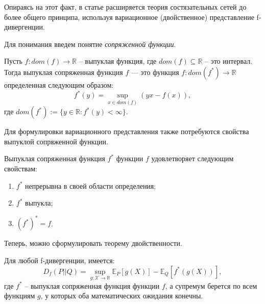 Опираясь на этот факт, в статье \cite{fgan} расширяется теория состязательных сетей до более общего принципа, используя вариационное (двойственное) представление f-дивергенции.

Для понимания введем понятие \textit{сопряженной функции}.
\begin{definition}
    Пусть $f:dom(f) \rightarrow \mathbb{R}$ -- выпуклая функция, где $dom(f) \subseteq \mathbb{R}$ -- это интервал. Тогда выпуклая сопряженная функция $f$ — это функция $f: dom(f^*) \rightarrow \mathbb{R}$ определенная следующим образом:
    \begin{equation*}
        f^*(y) = \sup_{x\in dom(f)}(yx - f(x)),
    \end{equation*}
    где $dom(f^*):=\{y \in \mathbb{R}: f^*(y) < \infty\}$.
\end{definition}

Для формулировки вариационного представления также потребуются свойства выпуклой сопряженной функции.
\begin{property}
    Выпуклая сопряженная функция $f^*$ функции $f$ удовлетворяет следующим свойствам:
    \begin{enumerate}
        \item $f^*$ непрерывна в своей области определения;
        \item $f^*$ выпукла;
        \item $(f^*)^* = f$.
    \end{enumerate}
\end{property}

Теперь, можно сформулировать теорему двойственности.
\begin{theorem}
    Для любой f-дивергенции, имеется:
    \begin{equation}
        D_f(P||Q) = \sup_{g:\mathcal{X} \rightarrow \mathbb{R}} \mathbb{E}_P[g(X)] - \mathbb{E}_Q[f^*(g(X))],
        \label{eq:dual}
    \end{equation}
    где $f^*$ -- выпуклая сопряженная функция функции $f$, а супремум берется по всем функциям $g$, у которых оба математических ожидания конечны.
\end{theorem}


